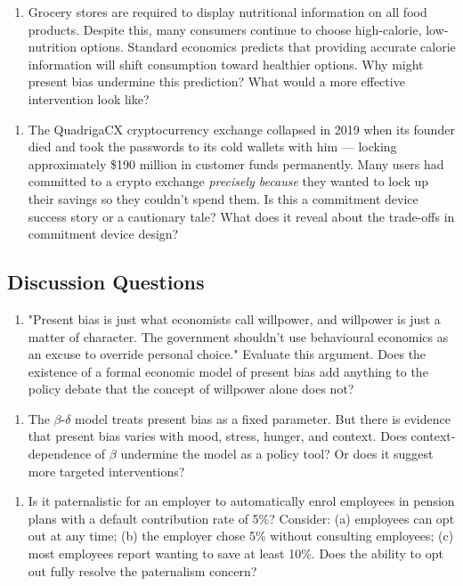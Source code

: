 \documentclass[12pt, letterpaper]{article}
\begin{document}
\begin{enumerate}
\item Grocery stores are required to display nutritional information on all food products. Despite this, many consumers continue to choose high-calorie, low-nutrition options. Standard economics predicts that providing accurate calorie information will shift consumption toward healthier options. Why might present bias undermine this prediction? What would a more effective intervention look like?
\end{enumerate}

\begin{enumerate}
\item The QuadrigaCX cryptocurrency exchange collapsed in 2019 when its founder died and took the passwords to its cold wallets with him --- locking approximately \$190 million in customer funds permanently. Many users had committed to a crypto exchange \textit{precisely because} they wanted to lock up their savings so they couldn't spend them. Is this a commitment device success story or a cautionary tale? What does it reveal about the trade-offs in commitment device design?
\end{enumerate}


\subsection{Discussion Questions}


\begin{enumerate}
\item "Present bias is just what economists call willpower, and willpower is just a matter of character. The government shouldn't use behavioural economics as an excuse to override personal choice." Evaluate this argument. Does the existence of a formal economic model of present bias add anything to the policy debate that the concept of willpower alone does not?
\end{enumerate}

\begin{enumerate}
\item The $\beta$-$\delta$ model treats present bias as a fixed parameter. But there is evidence that present bias varies with mood, stress, hunger, and context. Does context-dependence of $\beta$ undermine the model as a policy tool? Or does it suggest more targeted interventions?
\end{enumerate}

\begin{enumerate}
\item Is it paternalistic for an employer to automatically enrol employees in pension plans with a default contribution rate of 5\%? Consider: (a) employees can opt out at any time; (b) the employer chose 5\% without consulting employees; (c) most employees report wanting to save at least 10\%. Does the ability to opt out fully resolve the paternalism concern?
\end{enumerate}
\end{document}

